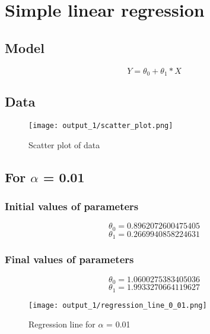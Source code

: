 \section{Simple linear regression}

\subsection{Model}
\begin{equation}
\label{eq:simple_linear_model}
Y = \theta_0 + \theta_1 * X
\end{equation}

\subsection{Data}
\begin{figure}[!ht]
  \texttt{[image: output\_1/scatter\_plot.png]}
  \caption{Scatter plot of data}
  \label{fig:scatter_plot}
\end{figure}

\subsection{For $\alpha$ = 0.01}
\subsubsection{Initial values of parameters}
\begin{equation}
\theta_0 = 0.8962072600475405
\end{equation}
\begin{equation}
\theta_1 = 0.2669940858224631
\end{equation}

\subsubsection{Final values of parameters}
\begin{equation}
\theta_0 = 1.0600275383405036
\end{equation}
\begin{equation}
\theta_1 = 1.9933270664119627
\end{equation}

\begin{figure}[!ht]
    \texttt{[image: output\_1/regression\_line\_0\_01.png]}
    \caption{Regression line for $\alpha$ = 0.01}
    \label{fig:regression_line_alpha_0_01}
\end{figure}

